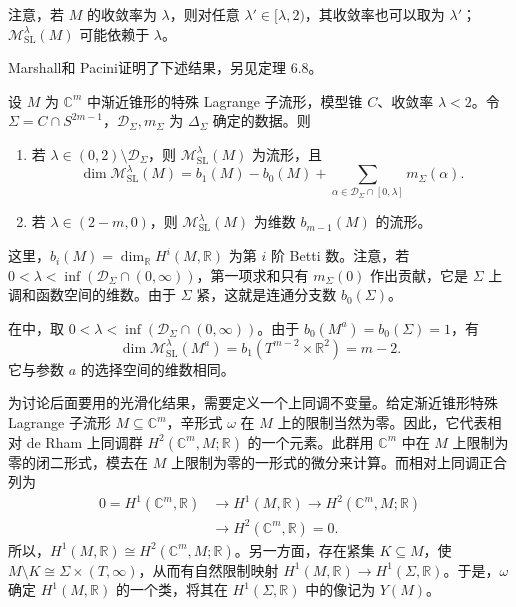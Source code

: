 注意，若 $M$ 的收敛率为 $\lambda$，则对任意 $\lambda'\in[\lambda,2)$，其收敛率也可以取为 $\lambda'$；$\mathcal M_{\mathrm{SL}}^\lambda(M)$ 可能依赖于 $\lambda$。

Marshall和 Pacini证明了下述结果，另见定理 6.8。
\begin{theorem}\label{thm:7.18}
设 $M$ 为 $\mathbb C^m$ 中渐近锥形的特殊 Lagrange 子流形，模型锥 $C$、收敛率 $\lambda<2$。令 $\Sigma=C\cap S^{2m-1}$，$\mathcal D_\Sigma,m_\Sigma$ 为 $\Delta_\Sigma$ 确定的数据。则
\begin{enumerate}
\item 若 $\lambda\in(0,2)\setminus\mathcal D_\Sigma$，则 $\mathcal M_{\mathrm{SL}}^\lambda(M)$ 为流形，且
\[
\dim\mathcal M_{\mathrm{SL}}^\lambda(M)
=b_1(M)-b_0(M)
+\sum_{\alpha\in\mathcal D_\Sigma\cap[0,\lambda]}m_\Sigma(\alpha).
\]
\item 若 $\lambda\in(2-m,0)$，则 $\mathcal M_{\mathrm{SL}}^\lambda(M)$ 为维数 $b_{m-1}(M)$ 的流形。
\end{enumerate}
\end{theorem}

这里，$b_i(M)=\dim_{\mathbb R}H^i(M,\mathbb R)$ 为第 $i$ 阶 Betti 数。注意，若 $0<\lambda<\inf(\mathcal D_\Sigma\cap(0,\infty))$，第一项求和只有 $m_\Sigma(0)$ 作出贡献，它是 $\Sigma$ 上调和函数空间的维数。由于 $\Sigma$ 紧，这就是连通分支数 $b_0(\Sigma)$。

\begin{example}\label{ex:7.19}
在中，取 $0<\lambda<\inf(\mathcal D_\Sigma\cap(0,\infty))$。由于 $b_0(M^a)=b_0(\Sigma)=1$，有
\[
\dim\mathcal M_{\mathrm{SL}}^\lambda(M^a)
=b_1(T^{m-2}\times\mathbb R^2)=m-2.
\]
它与参数 $a$ 的选择空间的维数相同。
\end{example}

为讨论后面要用的光滑化结果，需要定义一个上同调不变量。给定渐近锥形特殊 Lagrange 子流形 $M\subseteq\mathbb C^m$，辛形式 $\omega$ 在 $M$ 上的限制当然为零。因此，它代表相对 de Rham 上同调群 $H^2(\mathbb C^m,M;\mathbb R)$ 的一个元素。此群用 $\mathbb C^m$ 中在 $M$ 上限制为零的闭二形式，模去在 $M$ 上限制为零的一形式的微分来计算。而相对上同调正合列为
\[
\begin{split}
0=H^1(\mathbb C^m,\mathbb R)&\longrightarrow H^1(M,\mathbb R)
\longrightarrow H^2(\mathbb C^m,M;\mathbb R)\\
&\longrightarrow H^2(\mathbb C^m,\mathbb R)=0.
\end{split}
\]
所以，$H^1(M,\mathbb R)\cong H^2(\mathbb C^m,M;\mathbb R)$。另一方面，存在紧集 $K\subseteq M$，使 $M\setminus K\cong\Sigma\times(T,\infty)$，从而有自然限制映射 $H^1(M,\mathbb R)\to H^1(\Sigma,\mathbb R)$。于是，$\omega$ 确定 $H^1(M,\mathbb R)$ 的一个类，将其在 $H^1(\Sigma,\mathbb R)$ 中的像记为 $Y(M)$。

